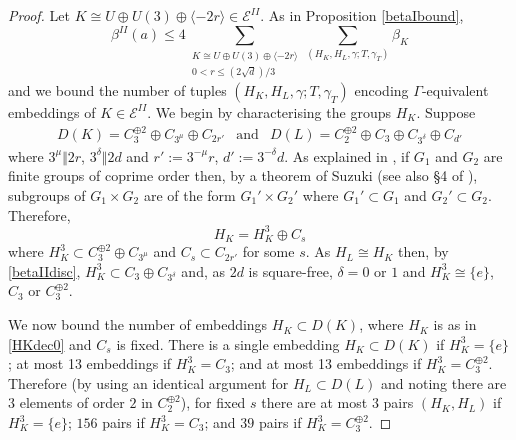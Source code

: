 \documentclass[12pt, a4paper]{article}
\newcommand{\la}{\langle}
\newcommand{\ra}{\rangle}
\newcommand{\ec}{\mathcal{E}}
\newcommand{\op}{\oplus}
\begin{document}
\begin{proof}
  Let $K \cong U \op U(3) \op \la -2r \ra \in \ec^{II}$.
  As in Proposition \ref{betaIbound},
  \begin{equation}\label{betaII0}
    \beta^{II}(a) \leq 4 
    \sum_{\substack{K \cong U \op U(3) \op \la -2r \ra \\ 0<r \leq (2 \sqrt{d})/3}}
    \sum_{(H_K, H_L, \gamma; T, \gamma_T)} \beta_K
  \end{equation}
  and we bound the number of tuples $(H_K, H_L, \gamma; T, \gamma_T)$ encoding $\Gamma$-equivalent embeddings of $K \in \ec^{II}$.
  We begin by characterising the groups $H_K$.
  Suppose
\begin{equation}\label{betaIIdisc}
  \begin{array}{ccc}
    D(K) = C_3^{\op 2} \op C_{3^{\mu}} \op C_{2r'} &
    \text{and} &
    D(L) = C_2^{\op 2} \op C_3 \op C_{3^{\delta}} \op C_{d'}
  \end{array}
\end{equation}
  where $3^{\mu} \Vert 2r$, $3^{\delta} \Vert 2d$ and $r':= 3^{-\mu} r$, $d':=3^{-\delta} d$.
As explained in \cite{PetrilloSubgroups}, if $G_1$ and $G_2$ are finite groups of coprime order then, by a theorem of Suzuki \cite{Suzuki} (see also \S4 of \cite{Schmidt}), subgroups of $G_1 \times G_2$ are of the form $G_1' \times G_2'$ where $G_1' \subset G_1$ and $G_2' \subset G_2$.
Therefore, 
  \begin{equation}\label{HKdec0}
    H_K = H_K^3 \op C_s
  \end{equation}
  where $H_K^3 \subset C_3^{\op 2} \op C_{3^{\mu}}$ and $C_s \subset C_{2r'}$ for some $s$.
  As $H_L \cong H_K$ then, by \eqref{betaIIdisc}, $H_K^3 \subset C_3 \op C_{3^{\delta}}$ and, as $2d$ is square-free, $\delta=0$ or $1$ and $H_K^3 \cong \{e \}$, $C_3$ or $C_3^{\op 2}$.
  
  We now bound the number of embeddings $H_K \subset D(K)$, where $H_K$ is as in \eqref{HKdec0} and $C_s$ is fixed.
  There is a single embedding $H_K \subset D(K)$ if $H_K^3 = \{e\}$; 
  at most 13 embeddings if $H_K^3=C_3$; 
  and at most 13 embeddings if $H_K^3 = C_3^{\op 2}$.
Therefore (by using an identical argument for $H_L \subset D(L)$ and noting there are 3 elements of order $2$ in $C_2^{\op 2}$), for fixed $s$ there are at most $3$ pairs $(H_K, H_L)$ if $H_K^3 = \{e \}$;
  $156$ pairs if $H_K^3 = C_3$;
  and $39$ pairs if $H_K^3 = C_3^{\op 2}$. 



\end{proof}
\end{document}
